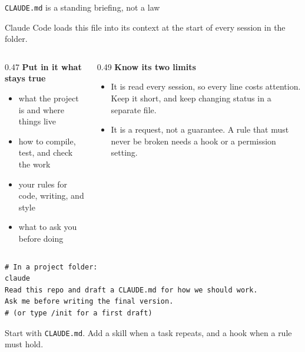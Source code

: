 \documentclass[aspectratio=169,11pt]{beamer}
\begin{document}
\begin{frame}[fragile,shrink=8]{\texttt{CLAUDE.md} is a standing briefing, not a law}

Claude Code loads this file into its context at the start of every session in the folder.

\vspace{0.1cm}

\begin{columns}[T]
\begin{column}{0.47\textwidth}
\textbf{Put in it what stays true}
\begin{itemize}\setlength\itemsep{0.15em}
    \item what the project is and where things live
    \item how to compile, test, and check the work
    \item your rules for code, writing, and style
    \item what to ask you before doing
\end{itemize}
\end{column}
\begin{column}{0.49\textwidth}
\textbf{Know its two limits}
\begin{itemize}\setlength\itemsep{0.15em}
    \item It is read every session, so every line costs attention. Keep it short, and keep changing status in a separate file.
    \item It is a request, not a guarantee. A rule that must never be broken needs a hook or a permission setting.
\end{itemize}
\end{column}
\end{columns}

\vspace{0.1cm}

\begin{verbatim}
# In a project folder:
claude
Read this repo and draft a CLAUDE.md for how we should work.
Ask me before writing the final version.
# (or type /init for a first draft)
\end{verbatim}

\alert{Start with \texttt{CLAUDE.md}. Add a skill when a task repeats, and a hook when a rule must hold.}

\end{frame}
\end{document}
